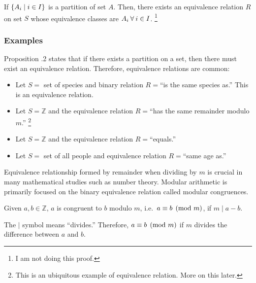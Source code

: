 \bigskip
\begin{proposition}
    If \(\{A_i\mid i\in I\}\) is a partition of set \(A\). Then, there exists an equivalence relation \(R\) on set \(S\) whose equivalence classes are \(A_i\:\forall\: i\in I\).
    \footnote{I am not doing this proof.}
\end{proposition}

\subsubsection{Examples}
Proposition \thechapter.2 states that if there exists a partition on a set, then there must exist an equivalence relation. Therefore, equivalence 
relations are common:
\begin{itemize}
    \item Let \(S=\) set of species and binary relation \(R=\)``is the same species as.'' This is an equivalence relation.
    \item Let \(S=\mathbb{Z}\) and the equivalence relation \(R=\)``has the same remainder modulo \(m\).''
    \footnote{This is an ubiquitous example of equivalence relation. More on this later.}
    \item Let \(S=\mathbb{Z}\) and the equivalence relation \(R=\)``equals.''
    \item Let \(S=\) set of all people and equivalence relation \(R=\)``same age as.''
\end{itemize} 

Equivalence relationship formed by remainder when dividing by \(m\) is crucial in many mathematical studies such as number theory.
Modular arithmetic is primarily focused on the binary equivalence relation called modular
congruences.

\begin{definition}
    Given \(a,b\in\mathbb{Z}\), \(a\) is congruent to \(b\) modulo \(m\), i.e.\ \(a\equiv b\pmod{m}\), if \(m\mid a-b\).
\end{definition}

The \(\mid\) symbol means ``divides.'' Therefore, \(a\equiv b\pmod{m}\) if \(m\) divides the difference between \(a\) and \(b\).

